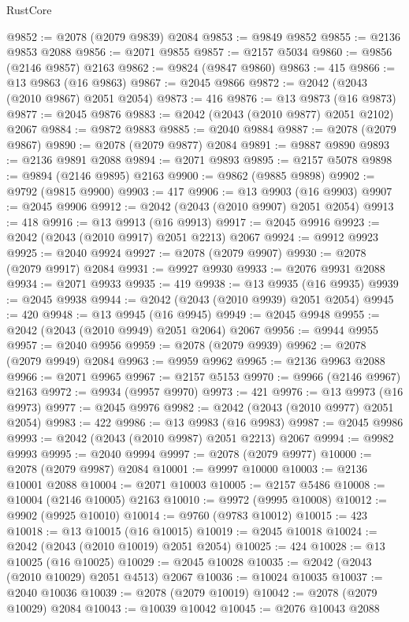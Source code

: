 \begin{lexlean}{RustCore}
\begin{coremodule}
@9852 := @2078 (@2079 @9839) @2084
@9853 := @9849 @9852
@9855 := @2136 @9853 @2088
@9856 := @2071 @9855
@9857 := @2157 @5034
@9860 := @9856 (@2146 @9857) @2163
@9862 := @9824 (@9847 @9860)
@9863 := 415
@9866 := @13 @9863 (@16 @9863)
@9867 := @2045 @9866
@9872 := @2042 (@2043 (@2010 @9867) @2051 @2054)
@9873 := 416
@9876 := @13 @9873 (@16 @9873)
@9877 := @2045 @9876
@9883 := @2042 (@2043 (@2010 @9877) @2051 @2102) @2067
@9884 := @9872 @9883
@9885 := @2040 @9884
@9887 := @2078 (@2079 @9867)
@9890 := @2078 (@2079 @9877) @2084
@9891 := @9887 @9890
@9893 := @2136 @9891 @2088
@9894 := @2071 @9893
@9895 := @2157 @5078
@9898 := @9894 (@2146 @9895) @2163
@9900 := @9862 (@9885 @9898)
@9902 := @9792 (@9815 @9900)
@9903 := 417
@9906 := @13 @9903 (@16 @9903)
@9907 := @2045 @9906
@9912 := @2042 (@2043 (@2010 @9907) @2051 @2054)
@9913 := 418
@9916 := @13 @9913 (@16 @9913)
@9917 := @2045 @9916
@9923 := @2042 (@2043 (@2010 @9917) @2051 @2213) @2067
@9924 := @9912 @9923
@9925 := @2040 @9924
@9927 := @2078 (@2079 @9907)
@9930 := @2078 (@2079 @9917) @2084
@9931 := @9927 @9930
@9933 := @2076 @9931 @2088
@9934 := @2071 @9933
@9935 := 419
@9938 := @13 @9935 (@16 @9935)
@9939 := @2045 @9938
@9944 := @2042 (@2043 (@2010 @9939) @2051 @2054)
@9945 := 420
@9948 := @13 @9945 (@16 @9945)
@9949 := @2045 @9948
@9955 := @2042 (@2043 (@2010 @9949) @2051 @2064) @2067
@9956 := @9944 @9955
@9957 := @2040 @9956
@9959 := @2078 (@2079 @9939)
@9962 := @2078 (@2079 @9949) @2084
@9963 := @9959 @9962
@9965 := @2136 @9963 @2088
@9966 := @2071 @9965
@9967 := @2157 @5153
@9970 := @9966 (@2146 @9967) @2163
@9972 := @9934 (@9957 @9970)
@9973 := 421
@9976 := @13 @9973 (@16 @9973)
@9977 := @2045 @9976
@9982 := @2042 (@2043 (@2010 @9977) @2051 @2054)
@9983 := 422
@9986 := @13 @9983 (@16 @9983)
@9987 := @2045 @9986
@9993 := @2042 (@2043 (@2010 @9987) @2051 @2213) @2067
@9994 := @9982 @9993
@9995 := @2040 @9994
@9997 := @2078 (@2079 @9977)
@10000 := @2078 (@2079 @9987) @2084
@10001 := @9997 @10000
@10003 := @2136 @10001 @2088
@10004 := @2071 @10003
@10005 := @2157 @5486
@10008 := @10004 (@2146 @10005) @2163
@10010 := @9972 (@9995 @10008)
@10012 := @9902 (@9925 @10010)
@10014 := @9760 (@9783 @10012)
@10015 := 423
@10018 := @13 @10015 (@16 @10015)
@10019 := @2045 @10018
@10024 := @2042 (@2043 (@2010 @10019) @2051 @2054)
@10025 := 424
@10028 := @13 @10025 (@16 @10025)
@10029 := @2045 @10028
@10035 := @2042 (@2043 (@2010 @10029) @2051 @4513) @2067
@10036 := @10024 @10035
@10037 := @2040 @10036
@10039 := @2078 (@2079 @10019)
@10042 := @2078 (@2079 @10029) @2084
@10043 := @10039 @10042
@10045 := @2076 @10043 @2088

\end{coremodule}
\end{lexlean}
